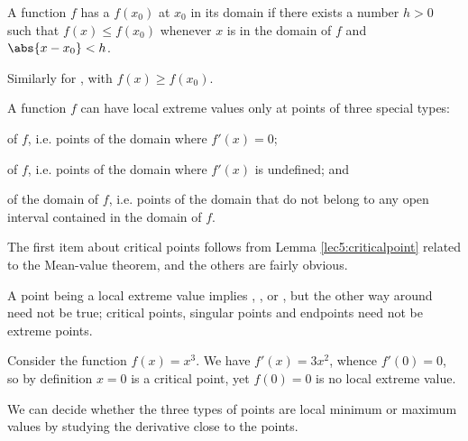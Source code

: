 \begin{definition}
	A function $f$ has a  $f(x_0)$ at $x_0$ in its domain if there exists a number $h > 0$ such that $f(x) \leq f(x_0)$ whenever $x$ is in the domain of $f$ and $\abs{x - x_0} < h$.

	Similarly for , with $f(x) \geq f(x_0)$.
\end{definition}

\noindent
A function $f$ can have local extreme values only at points of three special types:
\begin{romanlist}
	\item {} of $f$, i.e. points of the domain where $f'(x) = 0$;
	\item {} of $f$, i.e. points of the domain where $f'(x)$ is undefined; and
	\item {} of the domain of $f$, i.e. points of the domain that do not belong to any open interval contained in the domain of $f$.
\end{romanlist}

\noindent
The first item about critical points follows from Lemma \ref{lec5:criticalpoint} related to the Mean-value theorem, and the others are fairly obvious.

A point being a local extreme value implies , , or , but the other way around need not be true; critical points, singular points and endpoints need not be extreme points.

\begin{counterexample}
	Consider the function $f(x) = x^3$. We have $f'(x) = 3 x^2$, whence $f'(0) = 0$, so by definition $x = 0$ is a critical point, yet $f(0) = 0$ is no local extreme value.
\end{counterexample}

\noindent
We can decide whether the three types of points are local minimum or maximum values by studying the derivative close to the points.

